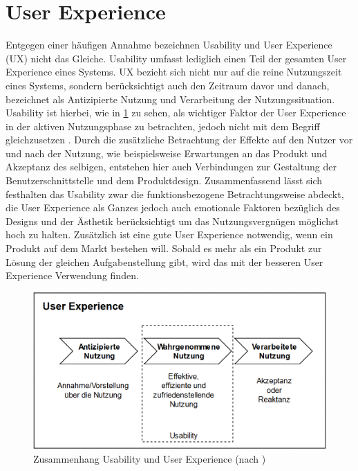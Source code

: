 \section{User Experience}
Entgegen einer häufigen Annahme bezeichnen Usability und User Experience (UX) nicht das Gleiche.
Usability umfasst lediglich einen Teil der gesamten User Experience eines Systems\cite{Knight.2019c}.
UX bezieht sich nicht nur auf die reine Nutzungszeit eines Systems, sondern berücksichtigt auch den Zeitraum davor und danach, bezeichnet als Antizipierte Nutzung und Verarbeitung der Nutzungssituation.
Usability ist hierbei, wie in \cref{fig:UX} zu sehen, als wichtiger Faktor der User Experience in der aktiven Nutzungsphase zu betrachten, jedoch nicht mit dem Begriff gleichzusetzen \cite{Sarodnick.2016}.
Durch die zusätzliche Betrachtung der Effekte auf den Nutzer vor und nach der Nutzung, wie beispielsweise Erwartungen an das Produkt und Akzeptanz des selbigen, entstehen hier auch Verbindungen zur Gestaltung der Benutzerschnittstelle und dem Produktdesign\cite{Richter.2016}.
Zusammenfassend lässt sich festhalten das Usability zwar die funktionsbezogene Betrachtungsweise abdeckt, die User Experience als Ganzes jedoch auch emotionale Faktoren bezüglich des Designs und der Ästhetik berücksichtigt um das Nutzungsvergnügen möglichst hoch zu halten.
Zusätzlich ist eine gute User Experience notwendig, wenn ein Produkt auf dem Markt bestehen will.
Sobald es mehr als ein Produkt zur Lösung der gleichen Aufgabenstellung gibt, wird das mit der besseren User Experience Verwendung finden\cite{Knight.2019c}.


\begin{figure}[H]
\begin{center}
  \includegraphics[scale=0.5]{figures/UX2.png}
  \caption{Zusammenhang Usability und User Experience (nach \cite{Sarodnick.2016})}
  \label{fig:UX}
\end{center}
\end{figure}

